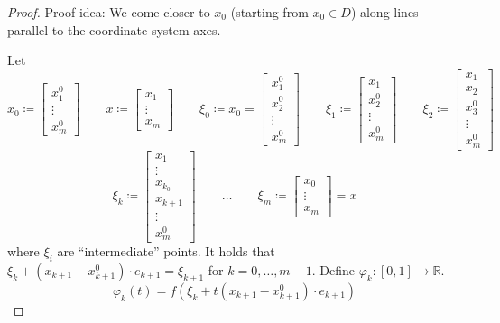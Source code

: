 \documentclass{article}
\begin{document}
\begin{proof}
  Proof idea: We come closer to $x_0$ (starting from $x_0 \in D$) along lines parallel to the coordinate system axes.


  Let
  \[
    x_0 \coloneqq \begin{bmatrix} x_1^0 \\ \vdots \\ x_m^0 \end{bmatrix} \qquad
    x \coloneqq \begin{bmatrix} x_1 \\ \vdots \\ x_m \end{bmatrix} \qquad
    \xi_0 \coloneqq x_0 = \begin{bmatrix} x_1^0 \\ x_2^0 \\ \vdots \\ x_m^0 \end{bmatrix} \qquad
    \xi_1 \coloneqq \begin{bmatrix} x_1 \\ x_2^0 \\ \vdots \\ x_m^0 \end{bmatrix} \qquad
    \xi_2 \coloneqq \begin{bmatrix} x_1 \\ x_2 \\ x_3^0 \\ \vdots \\ x_m^0 \end{bmatrix} \qquad
  \] \[
    \xi_k \coloneqq \begin{bmatrix} x_1 \\ \vdots \\ x_{k_0} \\ x_{k+1} \\ \vdots \\ x_m^0 \end{bmatrix} \qquad
    \dots \qquad
    \xi_m \coloneqq \begin{bmatrix} x_0 \\ \vdots \\ x_m \end{bmatrix} = x
  \]
  where $\xi_i$ are \enquote{intermediate} points.
  It holds that $\xi_k + (x_{k+1} - x_{k+1}^0) \cdot e_{k+1} = \xi_{k+1}$ for $k = 0, \dots, m-1$.
  Define $\varphi_k: [0,1] \to \mathbb R$.
  \[ \varphi_k(t) = f(\xi_k + t(x_{k+1} - x_{k+1}^0) \cdot e_{k+1}) \]

\end{proof}
\end{document}
